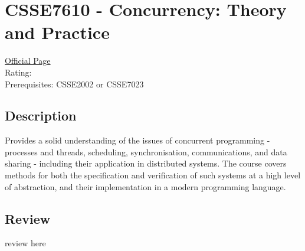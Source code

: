 \hypertarget{CSSE7610}{\section{CSSE7610 - Concurrency: Theory and Practice}}

\large
\textcolor{turbo_purple}{\href{https://my.uq.edu.au/programs-courses/course.html?course_code=CSSE7610}{Official Page}} \\
Rating: \cstar\cstar\cstar\cstar\ostar \\
Prerequisites: CSSE2002 or CSSE7023

\normalsize
\subsection*{Description}
Provides a solid understanding of the issues of concurrent programming - processes and threads, scheduling, synchronisation, communications, and data sharing - including their application in distributed systems.
The course covers methods for both the specification and verification of such systems at a high level of abstraction, and their implementation in a modern programming language.

\subsection*{Review}
review here
